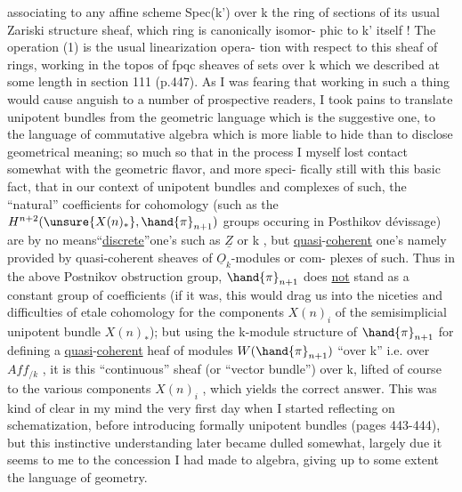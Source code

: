 
associating to any affine scheme  Spec(k') over k the ring of sections
of  its usual Zariski structure sheaf,  which ring is canonically isomor-%
phic to k' itself !  The operation (1) is the usual linearization opera-%
tion with respect to this sheaf of rings,  working in the topos of
fpqc sheaves of sets over k which we described at some length in section
111  (p.447).  As I was fearing that working in such a thing would cause
anguish to a number of prospective readers,  I took pains to translate
unipotent bundles from the geometric language which is the suggestive
one,  to the language of commutative algebra which is more liable to hide
than to disclose geometrical meaning;  so much so that in the process I
myself lost contact somewhat with the geometric flavor,  and more speci-%
fically still with this basic fact,  that in our context of unipotent
bundles and complexes of such,  the ``natural'' coefficients for cohomology
 (such as the $H^{n+2}(\unsure{X(n)_*},\hand{\pi}_{n+1})$ groups occuring in Posthikov dévissage) are
by no means``\uline{discrete}''\hand{/}one's such as $\underline{Z}$ or k ,  but \uline{quasi}-\uline{coherent} one's
namely provided by quasi-coherent sheaves of  $\underline{O}_k$-modules or com-%
plexes of such.  Thus in the above Postnikov obstruction group, $\hand{\pi}_{n+1}$
does \uline{not} stand as a constant group of coefficients (if it was,  this
would drag us into the niceties and difficulties of etale cohomology
for the components $X(n)_i$ of the semisimplicial unipotent bundle $X(n)_*$);
but using the k-module structure of $\hand{\pi}_{n+1}$ for defining a \uline{quasi}-\uline{coherent}
heaf of modules  $W(\hand{\pi}_{n+1})$  ``over k'' i.e.  over $Aff_{/k}$ ,  it is this
``continuous'' sheaf (or ``vector bundle'') over k, lifted of course to the
various components  $X(n)_i$ ,  which yields the correct answer.  This
was kind of clear in my mind the very first day when I started reflecting
on schematization,  before  introducing formally unipotent bundles
(pages 443-444),  but this instinctive understanding later became dulled
somewhat,  largely due it seems to me to the concession I had made to
 algebra,  giving up to some extent the language of geometry.

